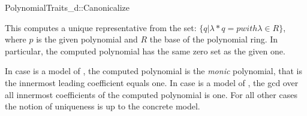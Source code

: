 \begin{ccRefConcept}{PolynomialTraits_d::Canonicalize}

\ccDefinition

This  computes a unique representative from the set: 
$\{ q | \lambda * q = p with \lambda \in R  \}$, where $p$ is the given polynomial and 
$R$ the base of the polynomial ring. 
In particular, the computed polynomial has the same zero set as the given one.

In case  is a model of , 
the computed polynomial is the {\em monic} polynomial, 
that is the innermost leading coefficient equals one.
In case  is a model 
of , the gcd over all innermost coefficients of 
the computed polynomial is one.
For all other cases the notion of uniqueness is up to the concrete model. 



\ccRefines 


\ccTypes


\ccGlue
{}

\ccOperations





\ccSeeAlso

\\
\\

\end{ccRefConcept}